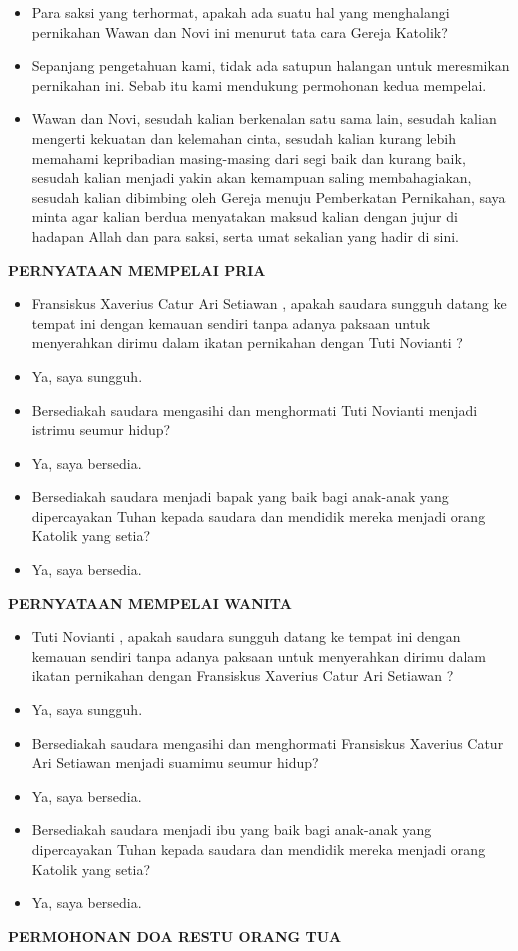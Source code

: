 \documentclass[10pt]{book}
\makeatletter
\newcommand{\subjudul}[1]{%
  {\parindent \z@ \normalfont
    \interlinepenalty\@M \bfseries #1\par\nobreak \vskip 20\p@ }}
\newcommand{\BI}[1]{\begin{itemize} \item[I:] #1 \end{itemize}}
\newcommand{\BL}[1]{\begin{itemize} \item[Wawan:] #1 \end{itemize}}
\newcommand{\BW}[1]{\begin{itemize} \item[Novi:] #1 \end{itemize}}
\newcommand{\BS}[1]{\begin{itemize} \item[Saksi:] #1 \end{itemize}}
\newcommand{\mempelaip}{Fransiskus Xaverius Catur Ari Setiawan }
\newcommand{\mempelaiw}{Tuti Novianti }
\makeatother
\begin{document}
\BI{Para saksi yang terhormat, apakah ada suatu hal yang menghalangi pernikahan Wawan dan Novi ini menurut tata cara Gereja Katolik?} 

\BS{Sepanjang pengetahuan kami, tidak ada satupun halangan untuk meresmikan pernikahan ini. Sebab itu kami mendukung permohonan kedua mempelai.}

\BI{Wawan dan Novi, sesudah kalian berkenalan satu sama lain, sesudah kalian mengerti kekuatan dan kelemahan cinta, sesudah kalian kurang lebih memahami kepribadian masing-masing dari segi baik dan kurang baik, sesudah kalian menjadi yakin akan kemampuan saling membahagiakan, sesudah kalian dibimbing oleh Gereja menuju Pemberkatan Pernikahan, saya minta agar kalian berdua menyatakan maksud kalian dengan jujur di hadapan Allah dan para saksi, serta umat sekalian yang hadir di sini.}


\subjudul{PERNYATAAN MEMPELAI PRIA}

\BI{\mempelaip , apakah saudara sungguh datang ke tempat ini dengan kemauan sendiri tanpa adanya paksaan untuk menyerahkan dirimu dalam ikatan pernikahan dengan \mempelaiw ?}

\BL{Ya, saya sungguh.}

\BI{Bersediakah saudara mengasihi dan menghormati  \mempelaiw menjadi istrimu seumur hidup?}

\BL{Ya, saya bersedia.}

\BI{Bersediakah saudara menjadi bapak yang baik bagi anak-anak yang dipercayakan Tuhan kepada saudara dan mendidik mereka menjadi orang Katolik yang setia?}

\BL{Ya, saya bersedia.}


\subjudul{PERNYATAAN MEMPELAI WANITA}

\BI{\mempelaiw, apakah saudara sungguh datang ke tempat ini dengan kemauan sendiri tanpa adanya paksaan untuk menyerahkan dirimu dalam ikatan pernikahan dengan \mempelaip?}

\BW{Ya, saya sungguh.}

\BI{Bersediakah saudara mengasihi dan menghormati  \mempelaip menjadi suamimu seumur hidup?}

\BW{Ya, saya bersedia.}

\BI{Bersediakah saudara menjadi ibu yang baik bagi anak-anak yang dipercayakan Tuhan kepada saudara dan mendidik mereka menjadi orang Katolik yang setia?}

\BW{Ya, saya bersedia.}


\subjudul{PERMOHONAN DOA RESTU ORANG TUA}
\end{document}
